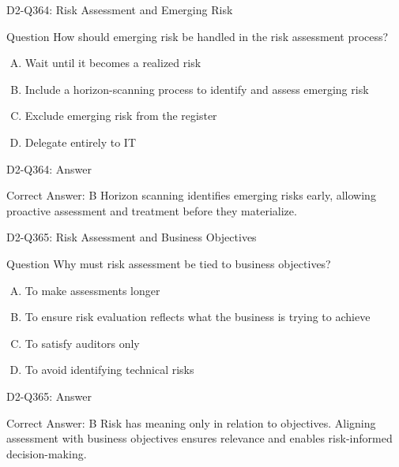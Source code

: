 \documentclass{beamer}
\begin{document}
\begin{frame}{D2-Q364: Risk Assessment and Emerging Risk}
	\begin{block}{Question}
		How should emerging risk be handled in the risk assessment process?
	\end{block}
	\begin{enumerate}[(A)]
		\item Wait until it becomes a realized risk
		\item Include a horizon-scanning process to identify and assess emerging risk
		\item Exclude emerging risk from the register
		\item Delegate entirely to IT
	\end{enumerate}
\end{frame}
\begin{frame}{D2-Q364: Answer}
	\begin{block}{Correct Answer: B}
		Horizon scanning identifies emerging risks early, allowing proactive assessment and treatment before they materialize.
	\end{block}
\end{frame}

\begin{frame}{D2-Q365: Risk Assessment and Business Objectives}
	\begin{block}{Question}
		Why must risk assessment be tied to business objectives?
	\end{block}
	\begin{enumerate}[(A)]
		\item To make assessments longer
		\item To ensure risk evaluation reflects what the business is trying to achieve
		\item To satisfy auditors only
		\item To avoid identifying technical risks
	\end{enumerate}
\end{frame}
\begin{frame}{D2-Q365: Answer}
	\begin{block}{Correct Answer: B}
		Risk has meaning only in relation to objectives. Aligning assessment with business objectives ensures relevance and enables risk-informed decision-making.
	\end{block}
\end{frame}

\end{document}
